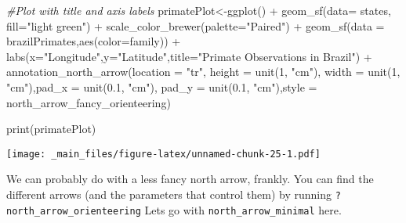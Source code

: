 \documentclass[
]{book}
\newenvironment{Shaded}{\begin{snugshade}}{\end{snugshade}}
\newcommand{\AttributeTok}[1]{\textcolor[rgb]{0.77,0.63,0.00}{#1}}
\newcommand{\CommentTok}[1]{\textcolor[rgb]{0.56,0.35,0.01}{\textit{#1}}}
\newcommand{\DecValTok}[1]{\textcolor[rgb]{0.00,0.00,0.81}{#1}}
\newcommand{\FloatTok}[1]{\textcolor[rgb]{0.00,0.00,0.81}{#1}}
\newcommand{\FunctionTok}[1]{\textcolor[rgb]{0.00,0.00,0.00}{#1}}
\newcommand{\NormalTok}[1]{#1}
\newcommand{\OtherTok}[1]{\textcolor[rgb]{0.56,0.35,0.01}{#1}}
\newcommand{\SpecialCharTok}[1]{\textcolor[rgb]{0.00,0.00,0.00}{#1}}
\newcommand{\StringTok}[1]{\textcolor[rgb]{0.31,0.60,0.02}{#1}}
\begin{document}
\begin{Shaded}
\begin{Highlighting}[]
\CommentTok{\#Plot with title and axis labels}
\NormalTok{primatePlot}\OtherTok{\textless{}{-}}\FunctionTok{ggplot}\NormalTok{() }\SpecialCharTok{+} 
  \FunctionTok{geom\_sf}\NormalTok{(}\AttributeTok{data=}\NormalTok{ states, }\AttributeTok{fill=}\StringTok{"light green"}\NormalTok{) }\SpecialCharTok{+}
  \FunctionTok{scale\_color\_brewer}\NormalTok{(}\AttributeTok{palette=}\StringTok{"Paired"}\NormalTok{) }\SpecialCharTok{+}
  \FunctionTok{geom\_sf}\NormalTok{(}\AttributeTok{data =}\NormalTok{ brazilPrimates,}\FunctionTok{aes}\NormalTok{(}\AttributeTok{color=}\NormalTok{family)) }\SpecialCharTok{+}
  \FunctionTok{labs}\NormalTok{(}\AttributeTok{x=}\StringTok{"Longitude"}\NormalTok{,}\AttributeTok{y=}\StringTok{"Latitude"}\NormalTok{,}\AttributeTok{title=}\StringTok{"Primate Observations in Brazil"}\NormalTok{)  }\SpecialCharTok{+}
   \FunctionTok{annotation\_north\_arrow}\NormalTok{(}\AttributeTok{location =} \StringTok{"tr"}\NormalTok{,  }\AttributeTok{height =} \FunctionTok{unit}\NormalTok{(}\DecValTok{1}\NormalTok{, }\StringTok{"cm"}\NormalTok{), }\AttributeTok{width =} \FunctionTok{unit}\NormalTok{(}\DecValTok{1}\NormalTok{, }\StringTok{"cm"}\NormalTok{),}\AttributeTok{pad\_x =} \FunctionTok{unit}\NormalTok{(}\FloatTok{0.1}\NormalTok{, }\StringTok{"cm"}\NormalTok{), }\AttributeTok{pad\_y =} \FunctionTok{unit}\NormalTok{(}\FloatTok{0.1}\NormalTok{, }\StringTok{"cm"}\NormalTok{),}\AttributeTok{style =}\NormalTok{ north\_arrow\_fancy\_orienteering)}


\FunctionTok{print}\NormalTok{(primatePlot)}
\end{Highlighting}
\end{Shaded}

\texttt{[image: \_main\_files/figure-latex/unnamed-chunk-25-1.pdf]}

We can probably do with a less fancy north arrow, frankly. You can find the different arrows (and the parameters that control them) by running \texttt{?north\_arrow\_orienteering} Lets go with \texttt{north\_arrow\_minimal} here.
\end{document}
